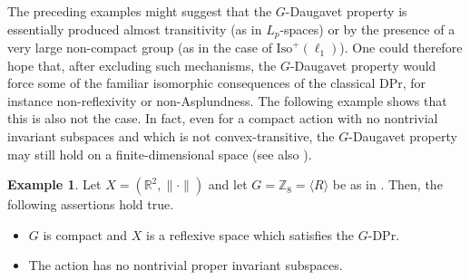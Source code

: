 \documentclass[a4paper,12pt]{amsart}
\theoremstyle{definition}
\theoremstyle{definition}
\newtheorem{example}[theorem]{Example}
\theoremstyle{remark}
\numberwithin{equation}{section}
\newcommand{\Iso}{\mathrm{Iso}}
\newcommand{\<}{\langle}
\renewcommand{\>}{\rangle}
\begin{document}
	
	The preceding examples might suggest that the $G$-Daugavet property is essentially produced almost transitivity (as in $L_p$-spaces) or by the presence of a very large non-compact group (as in the case of $\Iso^+(\ell_1)$). One could therefore hope that, after excluding such mechanisms, the $G$-Daugavet property would force some of the familiar isomorphic consequences of the classical DPr, for instance non-reflexivity or non-Asplundness. The following example shows that this is also not the case. In fact, even for a compact action with no nontrivial invariant subspaces and which is not convex-transitive, the $G$-Daugavet property may still hold on a finite-dimensional space (see also ).
	
	\begin{example}
		Let \(X=(\mathbb R^2,\|\cdot\|)\) and let \(G=\mathbb Z_8=\langle R\rangle\) be as in . Then, the following assertions hold true.
		\begin{itemize}
			\item[(a)] $G$ is compact and $X$ is a reflexive space which satisfies the $G$-DPr.
			
			
			\item[(b)] The action has no nontrivial proper invariant subspaces.
			

\end{itemize}
\end{example}
\end{document}
